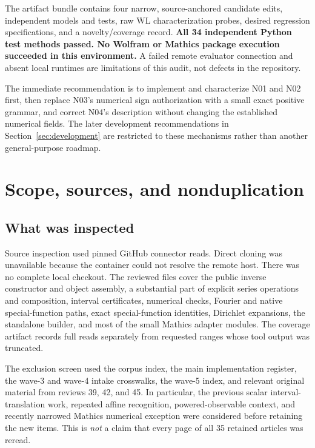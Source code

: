 \documentclass[11pt,letterpaper]{article}
\begin{document}
The artifact bundle contains four narrow, source-anchored candidate edits, independent models and tests, raw WL characterization probes, desired regression specifications, and a novelty/coverage record. \textbf{All 34 independent Python test methods passed. No Wolfram or Mathics package execution succeeded in this environment.} A failed remote evaluator connection and absent local runtimes are limitations of this audit, not defects in the repository.

The immediate recommendation is to implement and characterize N01 and N02 first, then replace N03's numerical sign authorization with a small exact positive grammar, and correct N04's description without changing the established numerical fields. The later development recommendations in Section~\ref{sec:development} are restricted to these mechanisms rather than another general-purpose roadmap.

\clearpage
\section{Scope, sources, and nonduplication}
\subsection{What was inspected}

Source inspection used pinned GitHub connector reads. Direct cloning was unavailable because the container could not resolve the remote host. There was no complete local checkout. The reviewed files cover the public inverse constructor and object assembly, a substantial part of explicit series operations and composition, interval certificates, numerical checks, Fourier and native special-function paths, exact special-function identities, Dirichlet expansions, the standalone builder, and most of the small Mathics adapter modules. The coverage artifact records full reads separately from requested ranges whose tool output was truncated.\cite{core,cert,numerical,series,identity,dirichlet,builder,mathics-compat}

The exclusion screen used the corpus index, the main implementation register, the wave-3 and wave-4 intake crosswalks, the wave-5 index, and relevant original material from reviews 39, 42, and 45. In particular, the previous scalar interval-translation work, repeated affine recognition, powered-observable context, and recently narrowed Mathics numerical exception were considered before retaining the new items. This is \emph{not} a claim that every page of all 35 retained articles was reread.\cite{review-index,status,wave3,wave4,wave5,r39,r42,r45}
\end{document}
